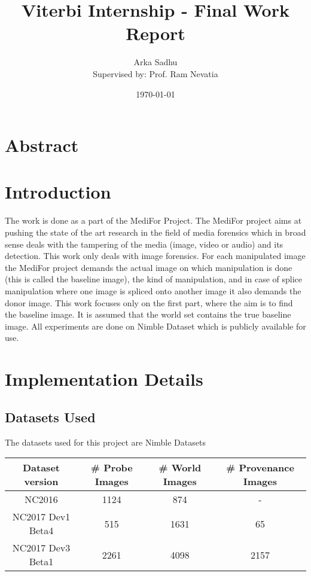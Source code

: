 \documentclass{article}
\title{Viterbi Internship - Final Work Report}
\author{Arka Sadhu\\{ Supervised by: Prof. Ram Nevatia}}
\date{\today}
\begin{document}
\maketitle

\tableofcontents
\newpage

\section{Abstract}

\section{Introduction}
The work is done as a part of the MediFor Project. The MediFor project aims at pushing the state of the art research in the field of media forensics which in broad sense deals with the tampering of the media (image, video or audio) and its detection. This work only deals with image forensics. For each manipulated image the MediFor project demands the actual image on which manipulation is done (this is called the baseline image), the kind of manipulation, and in case of splice manipulation where one image is spliced onto another image it also demands the donor image. This work focuses only on the first part, where the aim is to find the baseline image. It is assumed that the world set contains the true baseline image. All experiments are done on Nimble Dataset which is publicly available for use.
\section{Implementation Details}
\subsection{Datasets Used}
The datasets used for this project are Nimble Datasets
\begin{center}
  \begin{tabular}{| c | c | c | c |}
    \hline
    Dataset version & \# Probe Images & \# World Images & \# Provenance Images\\
    \hline
    NC2016 & 1124 & 874 & - \\
    \hline
    NC2017 Dev1 Beta4 & 515 & 1631 & 65 \\
    \hline
    NC2017 Dev3 Beta1 & 2261 & 4098 & 2157 \\
    \hline
  \end{tabular}
\end{center}
\end{document}
